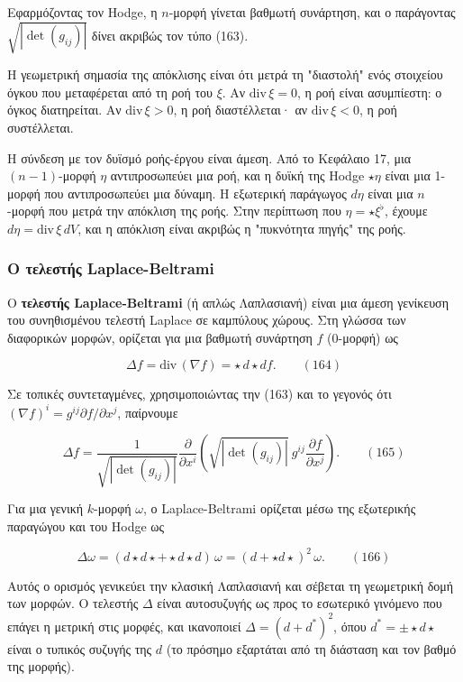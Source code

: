 \documentclass[12pt]{article}
\begin{document}
Εφαρμόζοντας τον Hodge, η $n$-μορφή γίνεται βαθμωτή συνάρτηση, και ο παράγοντας $\sqrt{|\det(g_{ij})|}$ δίνει ακριβώς τον τύπο (163).

Η γεωμετρική σημασία της απόκλισης είναι ότι μετρά τη "διαστολή" ενός στοιχείου όγκου που μεταφέρεται από τη ροή του $\xi$. Αν $\text{div} \, \xi = 0$, η ροή είναι ασυμπίεστη: ο όγκος διατηρείται. Αν $\text{div} \, \xi > 0$, η ροή διαστέλλεται· αν $\text{div} \, \xi < 0$, η ροή συστέλλεται.

Η σύνδεση με τον δυϊσμό ροής-έργου είναι άμεση. Από το Κεφάλαιο 17, μια $(n-1)$-μορφή $\eta$ αντιπροσωπεύει μια ροή, και η δυϊκή της Hodge $\star \eta$ είναι μια 1-μορφή που αντιπροσωπεύει μια δύναμη. Η εξωτερική παράγωγος $d\eta$ είναι μια $n$-μορφή που μετρά την απόκλιση της ροής. Στην περίπτωση που $\eta = \star \xi^\flat$, έχουμε $d\eta = \text{div} \, \xi \, dV$, και η απόκλιση είναι ακριβώς η "πυκνότητα πηγής" της ροής.

\subsubsection{Ο τελεστής Laplace-Beltrami}

Ο \textbf{τελεστής Laplace-Beltrami} (ή απλώς Λαπλασιανή) είναι μια άμεση γενίκευση του συνηθισμένου τελεστή Laplace σε καμπύλους χώρους. Στη γλώσσα των διαφορικών μορφών, ορίζεται για μια βαθμωτή συνάρτηση $f$ (0-μορφή) ως

\[
\Delta f = \text{div} \, (\nabla f) = \star \, d \star df. \qquad (164)
\]

Σε τοπικές συντεταγμένες, χρησιμοποιώντας την (163) και το γεγονός ότι $(\nabla f)^i = g^{ij} \partial f / \partial x^j$, παίρνουμε

\[
\Delta f = \frac{1}{\sqrt{|\det(g_{ij})|}} \frac{\partial}{\partial x^i} \left( \sqrt{|\det(g_{ij})|} \ g^{ij} \frac{\partial f}{\partial x^j} \right). \qquad (165)
\]

Για μια γενική $k$-μορφή $\omega$, ο Laplace-Beltrami ορίζεται μέσω της εξωτερικής παραγώγου και του Hodge ως

\[
\Delta \omega = (d \star d \star + \star d \star d) \, \omega = (d + \star d \star)^2 \, \omega. \qquad (166)
\]

Αυτός ο ορισμός γενικεύει την κλασική Λαπλασιανή και σέβεται τη γεωμετρική δομή των μορφών. Ο τελεστής $\Delta$ είναι αυτοσυζυγής ως προς το εσωτερικό γινόμενο που επάγει η μετρική στις μορφές, και ικανοποιεί $\Delta = (d + d^*)^2$, όπου $d^* = \pm \star d \star$ είναι ο τυπικός συζυγής της $d$ (το πρόσημο εξαρτάται από τη διάσταση και τον βαθμό της μορφής).
\end{document}
